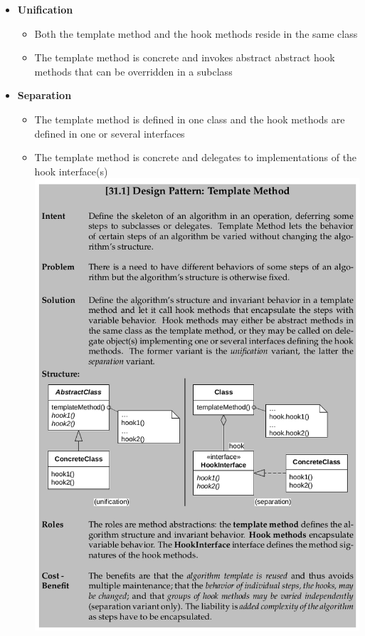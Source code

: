 \documentclass[11pt]{article}
\makeatletter
\def\maxwidth{\ifdim\Gin@nat@width>\linewidth\linewidth
    \else\Gin@nat@width\fi}
\let\Oldincludegraphics\includegraphics
\renewcommand{\includegraphics}[1]{\Oldincludegraphics[width=.8\maxwidth]{#1}}
\providecommand{\tightlist}{%
      \setlength{\itemsep}{0pt}\setlength{\parskip}{0pt}}
\makeatother
\begin{document}
\begin{itemize}
\tightlist
\item
  \textbf{Unification}

  \begin{itemize}
  \tightlist
  \item
    Both the template method and the hook methods reside in the same
    class
  \item
    The template method is concrete and invokes abstract abstract hook
    methods that can be overridden in a subclass
  \end{itemize}
\item
  \textbf{Separation}

  \begin{itemize}
  \tightlist
  \item
    The template method is defined in one class and the hook methods are
    defined in one or several interfaces
  \item
    The template method is concrete and delegates to implementations of
    the hook interface(s)
    \includegraphics{img/template_method_pattern.png}
  \end{itemize}
\end{itemize}
\end{document}

